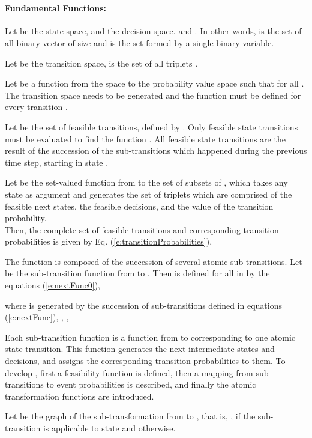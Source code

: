 \documentclass[letterpaper]{article}
\begin{document}
\\

\paragraph{Fundamental Functions:}

Let  be the state space, and  the decision space.  and . In other words,  is the set of all binary vector of size  and  is the set formed by a single binary variable.

Let  be the transition space,  is the set of all triplets .

Let  be a function from the space  to the probability value space  such that for all .
The transition space needs to be generated and the function  must be defined for every transition .

Let  be the set of feasible transitions, defined by . Only feasible state transitions must be evaluated to find the function . All feasible state transitions  are the result of the succession of the sub-transitions which happened during the previous time step, starting in state .

Let  be the set-valued function from  to the set of subsets of , which takes any state  as argument and 
generates the set of triplets   which are comprised of the feasible next states,
 the feasible decisions, and the value of the transition probability.\\

Then, the complete set of feasible transitions and corresponding transition probabilities is given by Eq. (\ref{e:transitionProbabilities}),


The function  is composed of the succession of several atomic sub-transitions. Let  be the sub-transition function from  to .
Then  is defined for all  in  by the equations (\ref{e:nextFunc0}),


where  is generated by the succession of sub-transitions defined in equations (\ref{e:nextFunc}), , ,

Each sub-transition function  is a function from  to  corresponding to one atomic 
state transition. This function generates the next intermediate states and decisions, and assigns the corresponding transition probabilities to them. To develop , first a feasibility function is defined, then a mapping from sub-transitions to event probabilities is described, and finally the atomic transformation functions are introduced.

Let  be the graph of the sub-transformation  from  to , that is, ,  if the 
sub-transition  is applicable to state  and  otherwise.
\end{document}
